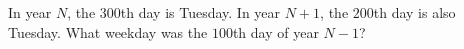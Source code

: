 In year $N$, the $300$th day is Tuesday. In year $N+1$, the $200$th day is also Tuesday. What weekday was the $100$th day of year $N-1$?
